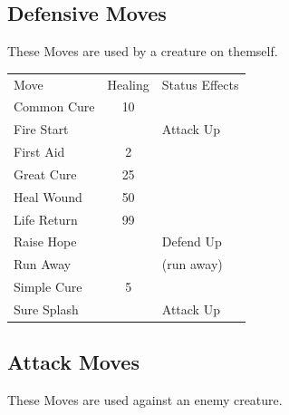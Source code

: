\documentclass[10pt,twocolumn]{memoir}
\begin{document}
\subsection{Defensive Moves}

These Moves are used by a creature on themself.

\begin{tabular}{l c l}
  Move & Healing & Status Effects \\
  Common Cure & 10 & \\
  Fire Start & & Attack Up \\
  First Aid & 2 & \\
  Great Cure & 25 & \\
  Heal Wound & 50 & \\
  Life Return & 99 & \\
  Raise Hope & & Defend Up \\
  Run Away & & (run away) \\
  Simple Cure & 5 & \\
  Sure Splash & & Attack Up \\
\end{tabular}

\subsection{Attack Moves}

These Moves are used against an enemy creature.
\end{document}
